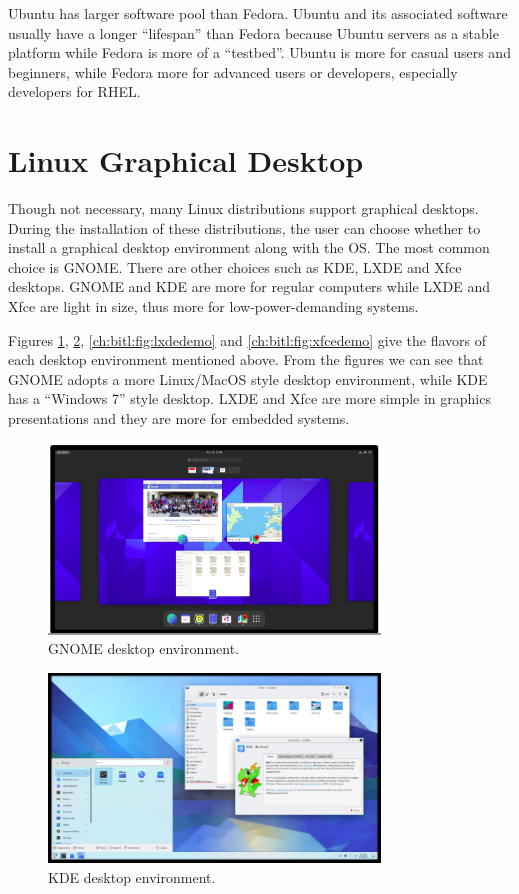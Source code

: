 Ubuntu has larger software pool than Fedora. Ubuntu and its associated software usually have a longer ``lifespan'' than Fedora because Ubuntu servers as a stable platform while Fedora is more of a ``testbed''. Ubuntu is more for casual users and beginners, while Fedora more for advanced users or developers, especially developers for RHEL.

\section{Linux Graphical Desktop}

Though not necessary, many Linux distributions support graphical desktops. During the installation of these distributions, the user can choose whether to install a graphical desktop environment along with the OS. The most common choice is GNOME. There are other choices such as KDE, LXDE and Xfce desktops. GNOME and KDE are more for regular computers while LXDE and Xfce are light in size, thus more for low-power-demanding systems.

Figures \ref{ch:bitl:fig:gnomedemo}, \ref{ch:bitl:fig:kdedemo}, \ref{ch:bitl:fig:lxdedemo} and \ref{ch:bitl:fig:xfcedemo} give the flavors of each desktop environment mentioned above. From the figures we can see that GNOME adopts a more Linux/MacOS style desktop environment, while KDE has a ``Windows 7'' style desktop. LXDE and Xfce are more simple in graphics presentations and they are more for embedded systems.

\begin{figure}
	\centering
	\includegraphics[width=250pt]{chapters/ch-brief-introduction-to-linux/figures/gnome_demo.png}
	\caption{GNOME desktop environment.} \label{ch:bitl:fig:gnomedemo}
\end{figure}

\begin{figure}
	\centering
	\includegraphics[width=250pt]{chapters/ch-brief-introduction-to-linux/figures/kde_demo.png}
	\caption{KDE desktop environment.} \label{ch:bitl:fig:kdedemo}
\end{figure}

